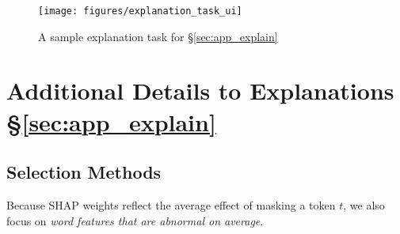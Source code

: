 

\begin{comment}
\begin{figure*}[ht]
\centering
\texttt{[image: figures/explanation\_instruction]}
\vspace{-15pt}
\caption{The instruction for the explanation study in \S\ref{subsec:exp_user_study}. \wts{Maybe remove.}}
\vspace{-10pt}
\label{fig:explanation_instruction}
\end{figure*}
\end{comment}

\begin{figure*}[ht]
\centering
\texttt{[image: figures/explanation\_task\_ui]}
\vspace{-5pt}
\caption{A sample explanation task for \S\ref{sec:app_explain}}
\vspace{-10pt}
\label{fig:explanation_ui}
\end{figure*}

\section{Additional Details to Explanations \S\ref{sec:app_explain}}
\label{appendix:explanation}


\subsection{Selection Methods}
\label{appendix:exp_rank}

Because  SHAP weights reflect the average effect of masking a token $t$, we also focus on \emph{word features that are abnormal on average}.

